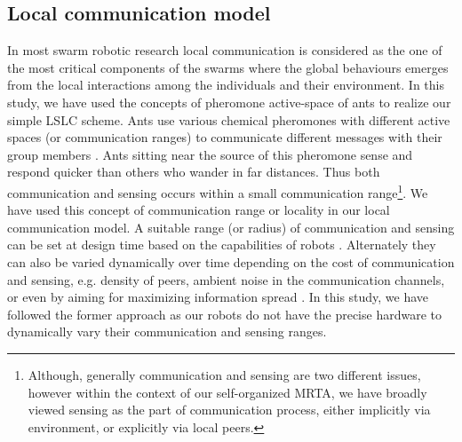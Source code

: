 \documentclass[journal]{IEEEtran}
\begin{document}
\subsection{Local communication model}
In most swarm robotic research local communication is considered as the one of the most critical components of the swarms where the global behaviours emerges from the local interactions among the individuals and their environment. In this study, we have used the concepts of pheromone active-space of ants to realize our simple LSLC scheme. Ants use various chemical pheromones with different active spaces (or communication ranges) to communicate different messages with their group members \cite{Holldobler1990}. Ants sitting near the source of this pheromone sense and respond quicker than others who wander in far distances. Thus both communication and sensing occurs within a small communication range\footnote{Although, generally communication and sensing are two different issues, however within the context of our self-organized MRTA, we have broadly viewed sensing as the part of communication process, either implicitly via environment, or explicitly via local peers.}. We have used this concept of communication range or locality in our local communication model. A suitable  range (or radius) of communication and sensing can be set at design time based on the capabilities of robots \cite{Agassounon+2002}. Alternately they can also be varied dynamically over time depending on the  cost of communication and sensing, e.g. density of peers, ambient noise in the communication channels, or even by aiming for maximizing information spread  \cite{Yoshida+2000}. In this study, we have followed the former approach as our robots do not have the precise hardware to dynamically vary their communication and sensing ranges. 
\end{document}
